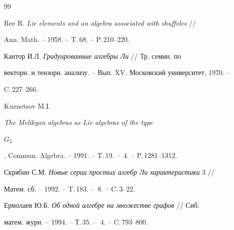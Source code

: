 \begin{thebibliography}{99} 


 




Ree R. {\em Lie elements and an algebra associated with shuffeles} //


Ann. Math. -- 1958. -- T.\,68. -- P.\,210--220.




Кантор И.Л. {\em Градуированные алгебры Ли} // Тр. семин. по


векторн. и тензорн. анализу. -- Вып. XV. Московский университет, 1970. --


C.\,227--266.




Kuznetsov M.I. {\em The Melikyan algebras as Lie algebras of the type


$G_2$}. Commun. Algebra. -- 1991. -- T.\,19. -- \No\,4. -- P.\,1281--1312.




Скрябин С.М. {\em Новые серии простых алгебр Ли характеристики} 3 //


Матем. сб. -- 1992. -- T.\,183. -- \No\,8. -- C.\,3--22.




Ермолаев Ю.Б. {\em Об одной алгебре на множестве графов} // Сиб.


матем. журн. -- 1994. -- Т.\,35. -- \No\,4. -- C.\,793--800.





\end{thebibliography} 





\vskip 2cm 


 






 

























